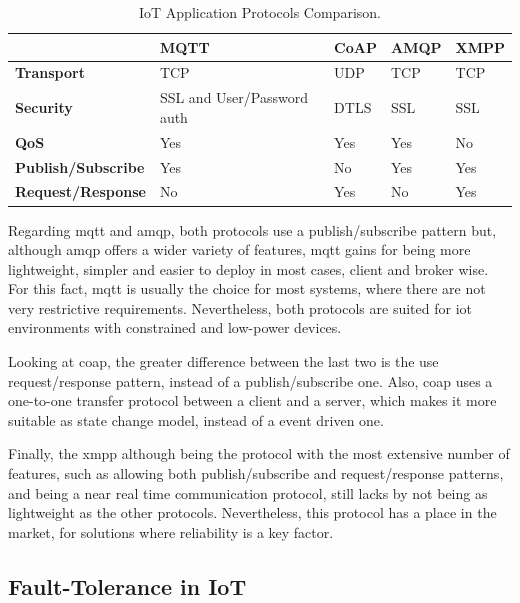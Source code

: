 \begin{table}[]
	\centering
	\begin{tabular}{|l|l|l|l|l|}
		\hline
		& \textbf{MQTT}              & \textbf{CoAP} & \textbf{AMQP} & \textbf{XMPP} \\ \hline
		\textbf{Transport}         & TCP                        & UDP           & TCP           & TCP           \\ \hline
		\textbf{Security}          & SSL and User/Password auth & DTLS          & SSL           & SSL           \\ \hline
		\textbf{QoS}               & Yes                        & Yes           & Yes           & No            \\ \hline
		\textbf{Publish/Subscribe} & Yes                        & No            & Yes           & Yes           \\ \hline
		\textbf{Request/Response}  & No                         & Yes           & No            & Yes           \\ \hline
	\end{tabular}
	\caption{IoT Application Protocols Comparison.}
	\label{iotapplayer}
\end{table}

Regarding \ac{mqtt} and \ac{amqp}, both protocols use a publish/subscribe pattern but, although \ac{amqp} offers a wider variety of features, \ac{mqtt} gains for being more lightweight, simpler and easier to deploy in most cases, client and broker wise. For this fact, \ac{mqtt} is usually the choice for most systems, where there are not very restrictive requirements. Nevertheless, both protocols are suited for \ac{iot} environments with constrained and low-power devices.

Looking at \ac{coap}, the greater difference between the last two is the use request/response pattern, instead of a publish/subscribe one. Also, \ac{coap} uses a one-to-one transfer protocol between a client and a server, which makes it more suitable as state change model, instead of a event driven one.

Finally, the \ac{xmpp} although being the protocol with the most extensive number of features, such as allowing both publish/subscribe and request/response patterns, and being a near real time communication protocol, still lacks by not being as lightweight as the other protocols. Nevertheless, this protocol has a place in the market, for solutions where reliability is a key factor.

\subsection{Fault-Tolerance in IoT}



